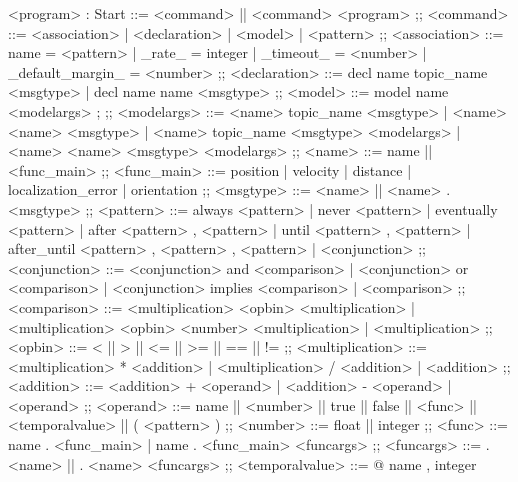 \begin{bnfgrammar}
    <program> : Start
    ::=
    <command> || <command> <program>
    ;;
    <command> ::=
    <association>
    | <declaration>
    | <model>
    | <pattern>
    ;; 
    <association> ::=
    name = <pattern>
    | \_rate\_ = integer
    | \_timeout\_ = <number>
    | \_default\_margin\_ = <number>
    ;;
    <declaration> ::=
    decl name topic\_name <msgtype>
    | decl name name <msgtype>
    ;;
    <model> ::= 
    model name \: <modelargs> ; %
    ;;
    <modelargs> ::= 
    <name> topic\_name <msgtype>
    | <name> <name> <msgtype>
    | <name> topic\_name <msgtype> <modelargs>
    | <name> <name> <msgtype> <modelargs>
    ;;
    <name> ::= 
    name || <func\_main>
    ;;
    <func\_main> ::= 
    position
    | velocity
    | distance
    | localization\_error
    | orientation
    ;;
    <msgtype> ::= 
    <name> || <name> . <msgtype>
    ;;
    <pattern> ::= 
    always <pattern>
    | never <pattern>
    | eventually <pattern>
    | after <pattern> , <pattern>
    | until <pattern> , <pattern>
    | after\_until <pattern> , <pattern> , <pattern>
    | <conjunction>
    ;;
    <conjunction> ::= 
    <conjunction> and <comparison>
    | <conjunction> or <comparison>
    | <conjunction> implies <comparison>
    | <comparison>
    ;;
    <comparison> ::= 
    <multiplication> <opbin> <multiplication>
    | <multiplication> <opbin> { <number> } <multiplication>
    | <multiplication>
    ;;
    <opbin> ::= 
    < || > || <= || >= || == || !=
    ;;
    <multiplication> ::= 
    <multiplication> * <addition>
    | <multiplication> / <addition>
    | <addition>
    ;;
    <addition> ::= <addition> + <operand>
    | <addition> - <operand>
    | <operand>
    ;;
    <operand> ::= 
    name || <number> || true || false || <func> || <temporalvalue> || ( <pattern> )
    ;;
    <number> ::= 
    float || integer
    ;;
    <func> ::= 
    name . <func\_main>
    | name . <func\_main> <funcargs>
    ;;
    <funcargs> ::= 
    . <name> || . <name> <funcargs>
    ;;
    <temporalvalue> ::= 
    @ { name , integer }
\end{bnfgrammar}
